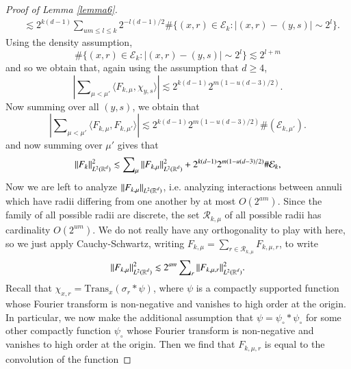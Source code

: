 \begin{proof}[Proof of Lemma \ref{lemma6}]
\begin{equation}
\begin{split}
        &\lesssim 2^{k(d-1)} \sum\nolimits_{um \leq l \leq k} 2^{-l(d-1)/2} \# \{ (x,r) \in \mathcal{E}_k: |(x,r) - (y,s)| \sim 2^l \}.
    \end{split}
    \end{equation}
    Using the density assumption,
    \begin{equation}
      \# \{ (x,r) \in \mathcal{E}_k: |(x,r) - (y,s)| \sim 2^l \} \lesssim 2^{l + m}
    \end{equation}
    and so we obtain that, again using the assumption that $d \geq 4$,
    \begin{equation}
      |\sum\nolimits_{\mu < \mu'} \langle F_{k,\mu}, \chi_{y,s} \rangle| \lesssim 2^{k(d-1)} 2^{m(1-u(d-3)/2)}.
    \end{equation}
    Now summing over all $(y,s)$, we obtain that
    \begin{equation}
      \left| \sum\nolimits_{\mu < \mu'} \langle F_{k,\mu}, F_{k,\mu'} \rangle \right| \lesssim 2^{k(d-1)} 2^{m(1 - u(d-3)/2)} \#(\mathcal{E}_{k,\mu'}).
    \end{equation}
    and now summing over $\mu'$ gives that
    \begin{equation}
      \| F_k \|_{L^2(\operatorname{\mathbb{R}}^d)}^2 \lesssim \sum\nolimits_\mu \| F_{k,\mu} \|_{L^2(\operatorname{\mathbb{R}}^d)}^2 + 2^{k(d-1)} 2^{m(1 - u(d-3)/2)} \# \mathcal{E}_k,
    \end{equation}
    Now we are left to analyze $\| F_{k,\mu} \|_{L^2(\operatorname{\mathbb{R}}^d)}$, i.e. analyzing interactions between annuli which have radii differing from one another by at most $O(2^{am})$. Since the family of all possible radii are discrete, the set $\mathcal{R}_{k,\mu}$ of all possible radii has cardinality $O(2^{um})$. We do not really have any orthogonality to play with here, so we just apply Cauchy-Schwartz, writing $F_{k,\mu} = \sum\nolimits_{r \in \mathcal{R}_{k,\mu}} F_{k,\mu,r}$, to write
    \begin{equation}
      \| F_{k,\mu} \|_{L^2(\operatorname{\mathbb{R}}^d)}^2 \lesssim 2^{am} \sum\nolimits_r \| F_{k,\mu,r} \|_{L^2(\operatorname{\mathbb{R}}^d)}^2.
    \end{equation}
    Recall that $\chi_{x,r} = \text{Trans}_x(\sigma_r * \psi)$, where $\psi$ is a compactly supported function whose Fourier transform is non-negative and vanishes to high order at the origin. In particular, we now make the additional assumption that $\psi = \psi_{\circ} * \psi_{\circ}$ for some other compactly function $\psi_{\circ}$ whose Fourier transform is non-negative and vanishes to high order at the origin. Then we find that $F_{k,\mu,r}$ is equal to the convolution of the function

\end{proof}
